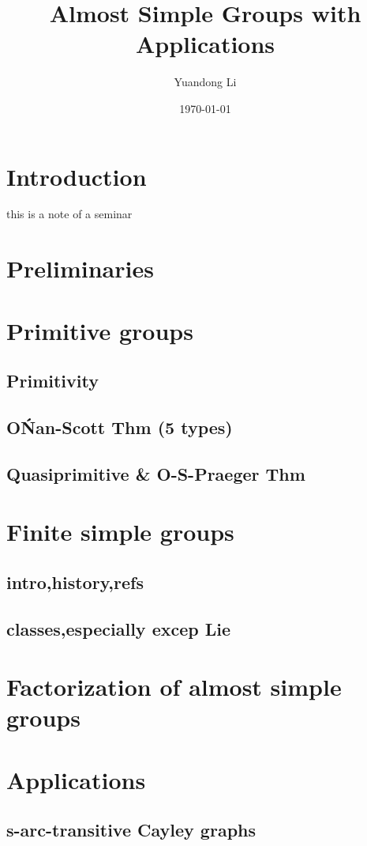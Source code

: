 \documentclass[a4,11pt]{article}
\title{Almost Simple Groups with Applications}
\author{Yuandong Li}
\date{\today}
\begin{document}
\maketitle

\tableofcontents

\section{Introduction}
this is a note of a seminar


\section{Preliminaries}

\section{Primitive groups}
\subsection{Primitivity}
\subsection{O\'Nan-Scott Thm (5 types)}
\subsection{Quasiprimitive \& O-S-Praeger Thm}

\section{Finite simple groups}
\subsection{intro,history,refs}
\subsection{classes,especially excep Lie}

\section{Factorization of almost simple groups}

\section{Applications}
\subsection{s-arc-transitive Cayley graphs}
\end{document}
